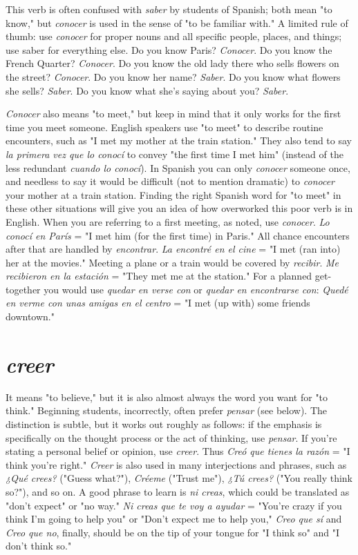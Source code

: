 This verb is often confused with \emph{saber} by students of Spanish;
both mean "to know," but \emph{conocer} is used in the sense of "to be familiar with." A limited rule of thumb: use \emph{conocer} for proper nouns and
all specific people, places, and things; use saber for everything else. Do
you know Paris? \emph{Conocer}. Do you know the French Quarter? \emph{Conocer}.
Do you know the old lady there who sells flowers on the street? \emph{Conocer}. Do you know her name? \emph{Saber}. Do you know what flowers she
sells? \emph{Saber}. Do you know what she's saying about you? \emph{Saber}.

\emph{Conocer} also means "to meet," but keep in mind that it only
works for the first time you meet someone. English speakers use "to
meet" to describe routine encounters, such as "I met my mother at
the train station." They also tend to say \emph{la primera vez que lo conocí}
to convey "the first time I met him" (instead of the less redundant
\emph{cuando lo conocí}). In Spanish you can only \emph{conocer} someone once, and
needless to say it would be difficult (not to mention dramatic) to \emph{conocer} your mother at a train station. Finding the right Spanish word for
"to meet" in these other situations will give you an idea of how overworked this poor verb is in English. When you are referring to a first
meeting, as noted, use \emph{conocer}. \emph{Lo conocí en París} = "I met him (for
the first time) in Paris." All chance encounters after that are handled
by \emph{encontrar}. \emph{La encontré en el cine} = "I met (ran into) her at the
movies." Meeting a plane or a train would be covered by \emph{recibir}. \emph{Me
recibieron en la estación} = "They met me at the station." For a
planned get-together you would use \emph{quedar en verse con} or \emph{quedar en
encontrarse con}: \emph{Quedé en verme con unas amigas en el centro} = "I
met (up with) some friends downtown."

\section{\emph{creer}}

It means "to believe," but it is also almost always the word
you want for "to think." Beginning students, incorrectly, often prefer
\emph{pensar} (see below). The distinction is subtle, but it works out roughly
as follows: if the emphasis is specifically on the thought process or the
act of thinking, use \emph{pensar}. If you're stating a personal belief or opinion, use \emph{creer}. Thus \emph{Creó que tienes la razón} = "I think you're right."
\emph{Creer} is also used in many interjections and phrases, such as \emph{¿Qué
crees?} ("Guess what?"), \emph{Créeme} ("Trust me"), \emph{¿Tú crees?} ("You really
think so?"), and so on. A good phrase to learn is \emph{ni creas}, which could
be translated as "don't expect" or "no way." \emph{Ni creas que te voy a ayudar} = "You're crazy if you think I'm going to help you" or "Don't expect me to help you," \emph{Creo que sí} and \emph{Creo que no}, finally, should be
on the tip of your tongue for "I think so" and "I don't think so."

